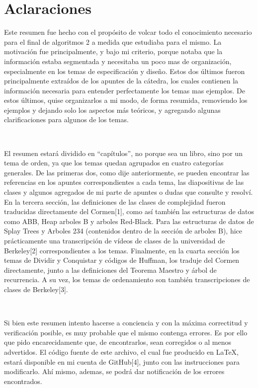 \documentclass[10pt, a4paper]{report}
\begin{document}
\newpage

\chapter*{Aclaraciones}

Este resumen fue hecho con el prop\'osito de volcar todo el conocimiento necesario para el final de algoritmos 2 a medida que estudiaba para el mismo. La motivaci\'on fue principalmente, y bajo mi criterio, porque notaba que la informaci\'on estaba segmentada y necesitaba un poco mas de organizaci\'on, especialmente en los temas de especificaci\'on y dise\~no. Estos dos \'ultimos fueron principalmente extra\'idos de los apuntes de la c\'atedra, los cuales contienen la informaci\'on necesaria para entender perfectamente los temas mas ejemplos. De estos \'ultimos, quise organizarlos a mi modo, de forma resumida, removiendo los ejemplos y dejando solo los aspectos m\'as te\'oricos, y agregando algunas clarificaciones para algunos de los temas.

~

El resumen estar\'a dividido en ``cap\'itulos'', no porque sea un libro, sino por un tema de orden, ya que los temas quedan agrupados en cuatro categor\'ias generales. De las primeras dos, como dije anteriormente, se pueden encontrar las referencias en los apuntes correspondientes a cada tema, las diapositivas de las clases y algunos agregados de mi parte de apuntes o dudas que consulte y resolv\'i. En la tercera secci\'on, las definiciones de las clases de complejidad fueron traducidas directamente del Cormen[1], como as\'i tambi\'en las estructuras de datos como ABB, Heap arboles B y arboles Red-Black. Para las estructuras de datos de Splay Trees y Arboles 234 (contenidos dentro de la secci\'on de arboles B), hice pr\'acticamente una transcripci\'on de v\'ideos de clases de la universidad de Berkeley[2] correspondientes a los temas. Finalmente, en la cuarta secci\'on los temas de Dividir y Conquistar y c\'odigos de Huffman, los traduje del Cormen directamente, junto a las definiciones del Teorema Maestro y \'arbol de recurrencia. A su vez, los temas de ordenamiento son también transcripciones de clases de Berkeley[3].

~

Si bien este resumen intento hacerse a conciencia y con la m\'axima correctitud y verificaci\'on posible, es muy probable que el mismo contenga errores. Es por ello que pido encarecidamente que, de encontrarlos, sean corregidos o al menos advertidos. El c\'odigo fuente de este archivo, el cual fue producido en LaTeX, estar\'a disponible en mi cuenta de GitHub[4], junto con las instrucciones para modificarlo. Ah\'i mismo, ademas, se podr\'a dar notificaci\'on de los errores encontrados.
\end{document}
